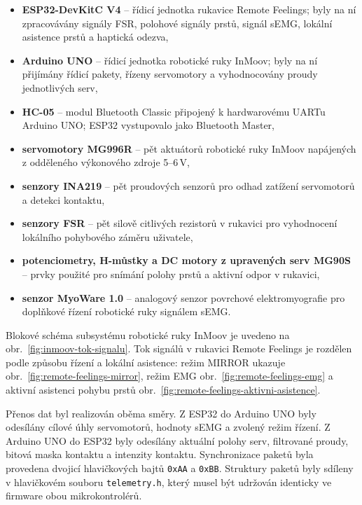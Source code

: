 \begin{itemize}
    \item \textbf{ESP32-DevKitC V4} -- řídicí jednotka rukavice Remote Feelings; byly na ní zpracovávány signály FSR, polohové signály prstů, signál sEMG, lokální asistence prstů a haptická odezva,
    \item \textbf{Arduino UNO} -- řídicí jednotka robotické ruky InMoov; byly na ní přijímány řídicí pakety, řízeny servomotory a vyhodnocovány proudy jednotlivých serv,
    \item \textbf{HC-05} -- modul Bluetooth Classic připojený k hardwarovému UARTu Arduino UNO; ESP32 vystupovalo jako Bluetooth Master,
    \item \textbf{servomotory MG996R} -- pět aktuátorů robotické ruky InMoov napájených z odděleného výkonového zdroje 5--6\,V,
    \item \textbf{senzory INA219} -- pět proudových senzorů pro odhad zatížení servomotorů a detekci kontaktu,
    \item \textbf{senzory FSR} -- pět silově citlivých rezistorů v rukavici pro vyhodnocení lokálního pohybového záměru uživatele,
    \item \textbf{potenciometry, H-můstky a DC motory z upravených serv MG90S} -- prvky použité pro snímání polohy prstů a aktivní odpor v rukavici,
    \item \textbf{senzor MyoWare 1.0} -- analogový senzor povrchové elektromyografie pro doplňkové řízení robotické ruky signálem sEMG\@.
\end{itemize}

Blokové schéma subsystému robotické ruky InMoov je uvedeno na obr.~\ref{fig:inmoov-tok-signalu}. Tok signálů v rukavici Remote Feelings je rozdělen podle způsobu řízení a lokální asistence: režim MIRROR ukazuje obr.~\ref{fig:remote-feelings-mirror}, režim EMG obr.~\ref{fig:remote-feelings-emg} a aktivní asistenci pohybu prstů obr.~\ref{fig:remote-feelings-aktivni-asistence}.









Přenos dat byl realizován oběma směry. Z ESP32 do Arduino UNO byly odesílány cílové úhly servomotorů, hodnoty sEMG a zvolený režim řízení. Z Arduino UNO do ESP32 byly odesílány aktuální polohy serv, filtrované proudy, bitová maska kontaktu a intenzity kontaktu. Synchronizace paketů byla provedena dvojicí hlavičkových bajtů \texttt{0xAA} a \texttt{0xBB}. Struktury paketů byly sdíleny v hlavičkovém souboru \texttt{telemetry.h}, který musel být udržován identicky ve firmware obou mikrokontrolérů.

